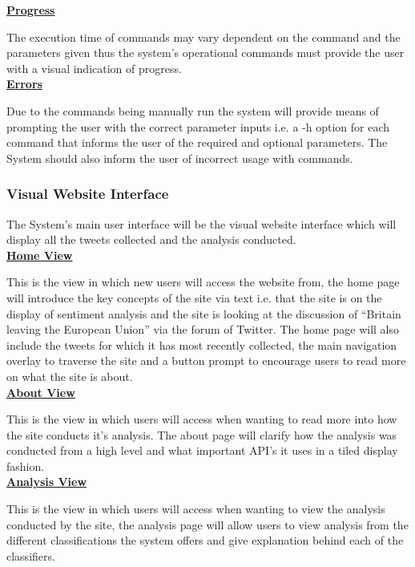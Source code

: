 \documentclass[11pt]{report}
\begin{document}
\textbf{\underline{Progress}}

The execution time of commands may vary dependent on the command and the parameters given thus the system's operational commands must provide the user with a visual indication of progress.
\\

\textbf{\underline{Errors}}

Due to the commands being manually run the system will provide means of prompting the user with the correct parameter inputs i.e. a -h option for each command that informs the user of the required and optional parameters. The System should also inform the user of incorrect usage with commands.

\subsubsection*{Visual Website Interface}
The System's main user interface will be the visual website interface which will display all the tweets collected and the analysis conducted. 
\\

\textbf{\underline{Home View}}

This is the view in which new users will access the website from, the home page will introduce the key concepts of the site via text i.e. that the site is on the display of sentiment analysis and the site is looking at the discussion of ``Britain leaving the European Union'' via the forum of Twitter. The home page will also include the tweets for which it has most recently collected, the main navigation overlay to traverse the site and a button prompt to encourage users to read more on what the site is about.
\\

\textbf{\underline{About View}}

This is the view in which users will access when wanting to read more into how the site conducts it's analysis. The about page will clarify how the analysis was conducted from a high level and what important API's it uses in a tiled display fashion.
\\

\textbf{\underline{Analysis View}}

This is the view in which users will access when wanting to view the analysis conducted by the site, the analysis page will allow users to view analysis from the different classifications the system offers and give explanation behind each of the classifiers.
\\
\end{document}
